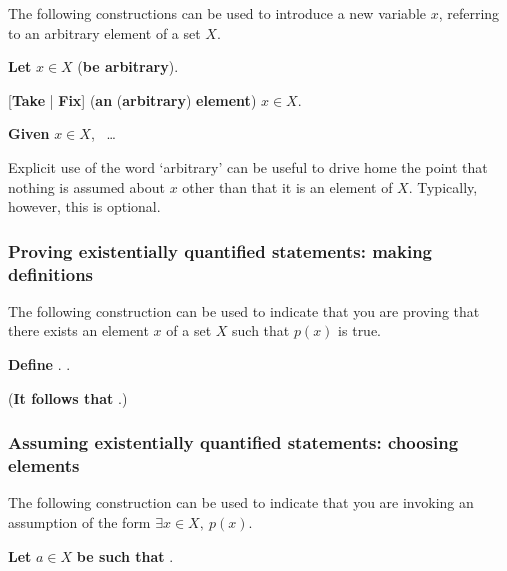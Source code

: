 \begin{vocabulary}
\label{vcbIntroducingVariable}
The following constructions can be used to introduce a new variable $x$, referring to an arbitrary element of a set $X$.

\begin{vocabtemplate}
\textbf{Let} $x \in X$ (\textbf{be arbitrary}).

\vtor

[\textbf{Take} | \textbf{Fix}] (\textbf{an} (\textbf{arbitrary}) \textbf{element}) $x \in X$.

\vtor

\textbf{Given} $x \in X$, ~\dots{}
\end{vocabtemplate}

Explicit use of the word `arbitrary' can be useful to drive home the point that nothing is assumed about $x$ other than that it is an element of $X$. Typically, however, this is optional.
\end{vocabulary}

\subsubsection*{Proving existentially quantified statements: making definitions}

\todo{}

\begin{vocabulary}
The following construction can be used to indicate that you are proving that there exists an element $x$ of a set $X$ such that $p(x)$ is true.

\begin{vocabtemplate}
\textbf{Define} . .

(\textbf{It follows that} .)
\end{vocabtemplate}
\end{vocabulary}

\todo{}

\subsubsection*{Assuming existentially quantified statements: choosing elements}

\todo{}

\begin{vocabulary}
The following construction can be used to indicate that you are invoking an assumption of the form $\exists x \in X,~p(x)$.

\begin{vocabtemplate}
\textbf{Let} $a \in X$ \textbf{be such that} .
\end{vocabtemplate}
\end{vocabulary}

